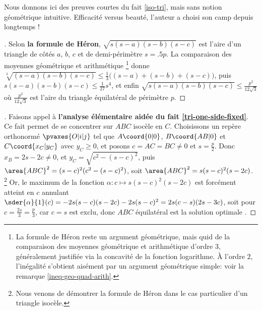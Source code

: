 \leavevmode

\smallskip

Nous donnons ici des preuves courtes du fait \ref{iso-tri}, mais sans notion géométrique intuitive. Efficacité versus beauté, l'auteur a choisi son camp depuis longtemps !




\begin{proof}[]
	Selon \textbf{la formule de Héron},
	$\sqrt{s(s - a)(s - b)(s - c)}$
	est l'aire d'un triangle de côtés $a$, $b$, $c$ et de demi-périmètre $s = \num{.5} p$.
	La comparaison des moyennes géométrique et arithmétique%
	\footnote{
		La formule de Héron reste un argument géométrique, mais quid de la comparaison des moyennes géométrique et arithmétique d'ordre $3$, généralement justifiée via la concavité de la fonction logarithme.
		À l'ordre $2$, l'inégalité s'obtient aisément par un argument géométrique simple: voir la remarque \ref{ineq-geo-quad-arith}.
	}
	donne
	$\sqrt[3]{(s - a)(s - b)(s - c)} \leq \frac13 \big( (s - a) + (s - b) + (s - c) \big)$,
	puis
	$s(s - a)(s - b)(s - c) \leq \frac{1}{27} s^4$,
	et enfin
	$\sqrt{s(s - a)(s - b)(s - c)} \leq \frac{p^2}{12 \sqrt{3}}$
	où $\frac{p^2}{12 \sqrt{3}}$ est l'aire du triangle équilatéral de périmètre $p$.
\end{proof}




\begin{proof}[]
	Faisons appel à \textbf{l'analyse élémentaire aidée du fait \ref{tri-one-side-fixed}}.
	Ce fait permet de se concentrer sur $ABC$ isocèle en $C$. 
	Choisissons un repère orthonormé $\pvaxes{O | i | j}$ tel que  $A\coord{0 | 0}$, $B\coord{AB | 0}$ et $C\coord{x_C | y_C}$ avec $y_C \geq 0$, et posons $c = AC = BC \neq 0$ et $s = \frac{p}{2}$.
	Donc
	$x_B = 2 s - 2 c \neq 0$, et 
	$y_C = \sqrt{c^2 - (s - c)^2}$, 
	puis
	$\area{ABC}^2 = (s - c)^2 (c^2 - (s - c)^2 )$,
	soit
	$\area{ABC}^2 = s (s - c)^2 (s - 2 c)$.%
	\footnote{
		Nous venons de démontrer la formule de Héron dans le cas particulier d'un triangle isocèle.
	}
	Or, le maximum de la fonction 
	$\alpha : c \mapsto s (s - c)^2 (s - 2 c)$ est forcément atteint en $c$ annulant 
	$\sder{\alpha}{1}(c) = - 2 s (s - c) (s - 2 c) - 2 s (s - c)^2 = 2 s (c - s) (2s - 3c)$, 
	soit pour $c = \frac{2s}{3} = \frac{p}{3}$, car $c = s$ est exclu,
	donc $ABC$ équilatéral est la solution \og optimale \fg.
\end{proof}


